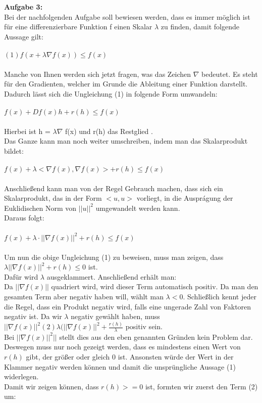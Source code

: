 \vspace{15pt}

\textbf{Aufgabe 3:}\\
Bei der nachfolgenden Aufgabe soll bewiesen werden, dass es immer möglich ist für eine differenzierbare Funktion f einen Skalar $\lambda$ zu finden, damit folgende Aussage gilt: \\ \\
$(1) f(x + \lambda \nabla f(x)) \leq f(x)$ \\ \\
Manche von Ihnen werden sich jetzt fragen, was das Zeichen $\nabla$ bedeutet. Es steht für den Gradienten, welcher im Grunde die Ableitung einer Funktion darstellt.
Dadurch lässt sich die Ungleichung (1) in folgende Form umwandeln: \\ \\
$f(x) + Df(x)h + r(h) \leq f(x)$  \\ \\
Hierbei ist h = $\lambda \nabla$ f(x) und r(h) das Restglied %
. \\
Das Ganze kann man noch weiter umschreiben, indem man das Skalarprodukt bildet: \\ \\
$f(x) + \lambda <\nabla f(x), \nabla f(x)> + r(h) \leq f(x)$ \\ \\
Anschließend kann man von der Regel Gebrauch machen, dass sich ein Skalarprodukt, das in der Form $<u,u>$ vorliegt, in die Auspr\'agung der Euklidischen Norm von $||u||^2$ umgewandelt werden kann. \\
Daraus folgt: \\ \\
$f(x) + \lambda \cdot || \nabla f(x)||^2 + r(h) \leq f(x)$ \\ \\
Um nun die obige Ungleichung (1) zu beweisen, muss man zeigen, dass \\ $\lambda ||\nabla f(x)||^2 + r(h) \leq 0$ ist.\\
Dafür wird $\lambda$ ausgeklammert. Anschließend erhält man:\\
Da $||\nabla f(x)||$ quadriert wird, wird dieser Term automatisch positiv. Da man den gesamten Term aber negativ haben will, wählt man $\lambda < 0.$ Schließlich kennt jeder die Regel, dass ein Produkt negativ wird, falls eine ungerade Zahl von Faktoren negativ ist. Da wir $\lambda$ negativ gewählt haben, muss \\ $||\nabla f(x)||^2$$(2) \lambda (||\nabla f(x)||^2 + \frac{r(h)}{\lambda}$ positiv sein.\\
Bei $||\nabla f(x)||^2||$ stellt dies aus den eben genannten Gr\"unden kein Problem dar. Deswegen muss nur noch gezeigt werden, dass es mindestens einen Wert von $r(h)$ gibt, der gr\"oßer oder gleich 0 ist. Ansonsten würde der Wert in der Klammer negativ werden k\"onnen und damit die unspr\"ungliche Aussage (1) widerlegen.\\
Damit wir zeigen k\"onnen, dass $r(h) >= 0$ ist, formten wir zuerst den Term (2) um:\\

